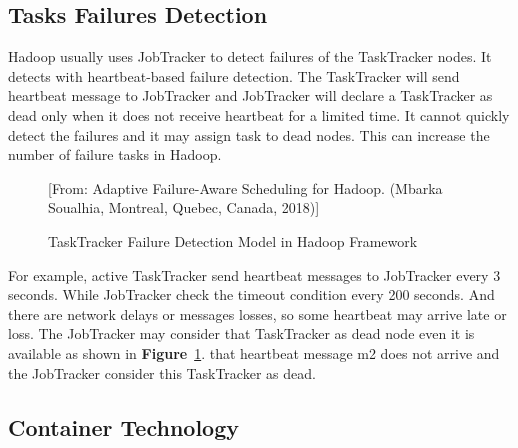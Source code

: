 \documentclass[12pt,oneside,openright,a4paper]{cpe-english-project}
\begin{document}
\subsection{Tasks Failures Detection}
\hspace{10mm}Hadoop usually uses JobTracker to detect failures of the TaskTracker nodes.  It detects with heartbeat-based failure detection.  The TaskTracker will send heartbeat message to JobTracker and JobTracker will declare a TaskTracker as dead only when it does not receive heartbeat for a limited time.  It cannot quickly detect the failures and it may assign task to dead nodes.  This can increase the number of failure tasks in Hadoop. \cite{adaptiveScheduling}

\begin{figure}[!h]\centering
  \setlength{\fboxrule}{0mm} %
  \setlength{\fboxsep}{0cm}
  \caption{TaskTracker Failure Detection Model in Hadoop Framework}\label{fig:tasktracker}
  [From: Adaptive Failure-Aware Scheduling for Hadoop. (Mbarka Soualhia, Montreal, Quebec, Canada, 2018)]
\end{figure}

\hspace{10mm}For example, active TaskTracker send heartbeat messages to JobTracker every 3 seconds.  While JobTracker check the timeout condition every 200 seconds.  And there are network delays or messages losses, so some heartbeat may arrive late or loss.  The JobTracker may consider that TaskTracker as dead node even it is available as shown in \textbf{Figure}~\ref{fig:tasktracker}. that heartbeat message m2 does not arrive and the JobTracker consider this TaskTracker as dead.

\newpage

\subsection{Container Technology}
\end{document}
